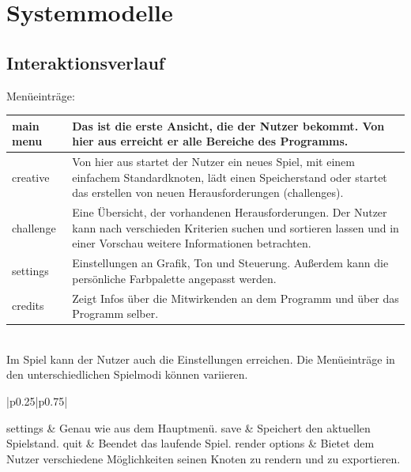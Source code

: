 \chapter{Systemmodelle}


\section{Interaktionsverlauf}

Menüeinträge:

\begin{longtable}{|p{}|p{}|}
    \hline
    main menu & Das ist die erste Ansicht, die der Nutzer bekommt. Von hier aus erreicht er alle Bereiche des Programms.\\
    
    \hline
    
    creative & Von hier aus startet der Nutzer ein neues Spiel, mit einem einfachem Standardknoten, lädt einen Speicherstand oder startet das erstellen von neuen Herausforderungen (challenges).\\
    
    \hline
    
    challenge & Eine Übersicht, der vorhandenen Herausforderungen. Der Nutzer kann nach verschieden Kriterien suchen und sortieren lassen und in einer Vorschau weitere Informationen betrachten.\\

    \hline
    
    settings & Einstellungen an Grafik, Ton und Steuerung. Außerdem kann die persönliche Farbpalette angepasst werden.\\

    \hline
    
    credits & Zeigt Infos über die Mitwirkenden an dem Programm und über das Programm selber.\\

    \hline
    
   \end{longtable}
    
%	  
	~\\
	Im Spiel kann der Nutzer auch die {\color{red} Einstellungen} erreichen. Die Menüeinträge in den unterschiedlichen Spielmodi können variieren.
\begin{longtable}{|p{}|p{}|}

	settings & Genau wie aus dem Hauptmenü.
    \hline
	save & Speichert den aktuellen Spielstand.
    \hline
	quit & Beendet das laufende Spiel.
    \hline
	render options & Bietet dem Nutzer verschiedene Möglichkeiten seinen Knoten zu rendern und zu exportieren.
\end{longtable}

